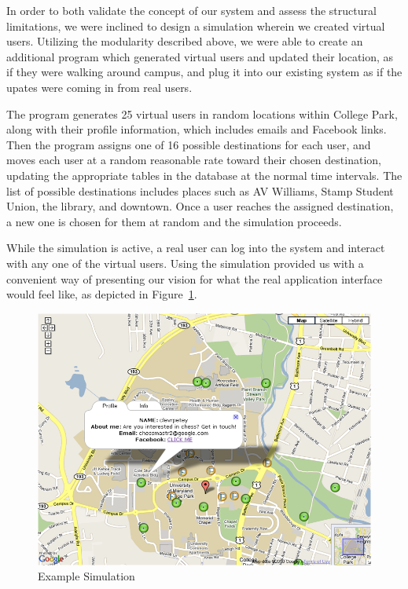 \documentclass[11pt]{article}
\begin{document}
In order to both validate the concept of our system and assess the
structural limitations, we were inclined to design a simulation wherein we
created virtual users. Utilizing the modularity described above, we were
able to create an additional program which generated virtual users and
updated their location, as if they were walking around campus, and plug it
into our existing system as if the upates were coming in from real users.

The program generates 25 virtual users in random locations within
College Park, along with their profile information, which includes
emails and Facebook links. Then the program assigns one of 16 possible
destinations for each user, and moves each user at a random reasonable
rate toward their chosen destination, updating the appropriate tables
in the database at the normal time intervals. The list of possible
destinations includes places such as AV Williams, Stamp Student Union,
the library, and downtown. Once a user reaches the assigned destination,
a new one is chosen for them at random and the simulation proceeds.

While the simulation is active, a real user can log into the system
and interact with any one of the virtual users. Using the simulation
provided us with a convenient way of presenting our vision for
what the real application interface would feel like, as depicted in
Figure~\ref{fig:sim1}.


\begin{figure}[h]
\begin{center}
  \includegraphics[scale=0.5]{sim1.png}
\caption{Example Simulation}
\label{fig:sim1} 
\end{center}
\end{figure}
\end{document}
